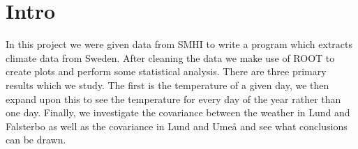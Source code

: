 \section{Intro}

In this project we were given data from SMHI to write a program which extracts climate data from Sweden. After cleaning the data we make use of ROOT to create plots and perform some statistical analysis. There are three primary results which we study. The first is the temperature of a given day, we then expand upon this to see the temperature for every day of the year rather than one day. Finally, we investigate the covariance between the weather in Lund and Falsterbo as well as the covariance in Lund and Umeå and see what conclusions can be drawn. 
